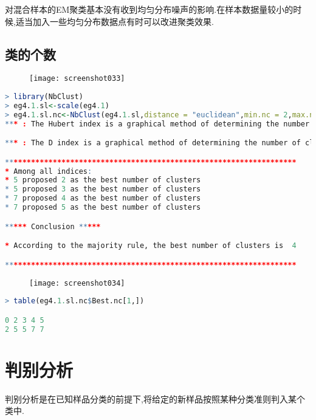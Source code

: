 \documentclass[11pt,a4paper,oneside]{book}
\begin{document}
对混合样本的EM聚类基本没有收到均匀分布噪声的影响.在样本数据量较小的时候,适当加入一些均匀分布数据点有时可以改进聚类效果.
\section{类的个数}
\begin{figure}[H]
	\texttt{[image: screenshot033]}
	\label{fig:screenshot033}
\end{figure}

\begin{lstlisting}[language=r]
> library(NbClust)
> eg4.1.sl<-scale(eg4.1)
> eg4.1.sl.nc<-NbClust(eg4.1.sl,distance = "euclidean",min.nc = 2,max.nc = 5,method = "average")
*** : The Hubert index is a graphical method of determining the number of clusters. In the plot of Hubert index, we seek a significant knee that corresponds to a significant increase of the value of the measure i.e the significant peak in Hubert index second differences plot. 

*** : The D index is a graphical method of determining the number of clusters. In the plot of D index, we seek a significant knee (the significant peak in D index second differences plot) that corresponds to a significant increase of the value of the measure. 

******************************************************************* 
* Among all indices:                                                
* 5 proposed 2 as the best number of clusters 
* 5 proposed 3 as the best number of clusters 
* 7 proposed 4 as the best number of clusters 
* 7 proposed 5 as the best number of clusters 

***** Conclusion *****                            

* According to the majority rule, the best number of clusters is  4 

******************************************************************* 
\end{lstlisting}
\begin{figure}[H]
	\centering
	\texttt{[image: screenshot034]}
	\label{fig:screenshot034}
\end{figure}

\begin{lstlisting}[language=r]
> table(eg4.1.sl.nc$Best.nc[1,])

0 2 3 4 5 
2 5 5 7 7 
\end{lstlisting}

\chapter{判别分析}
判别分析是在已知样品分类的前提下,将给定的新样品按照某种分类准则判入某个类中.
\end{document}
